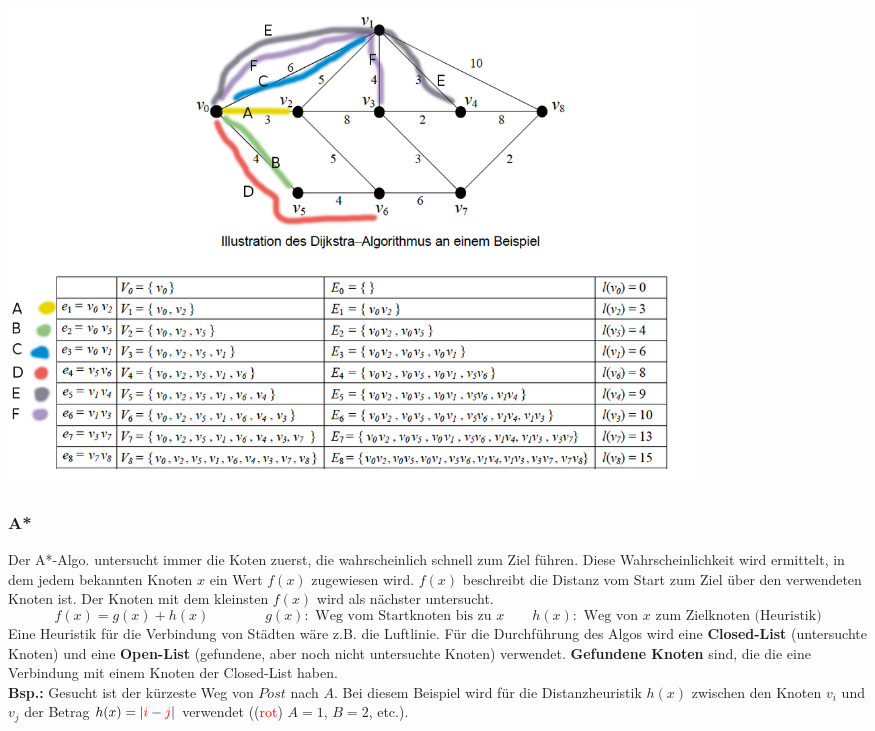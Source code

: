 \begin{center}
	\includegraphics[width=0.8\textwidth]{Content/Graphen/Dijkstra.png}
\end{center}


\subsubsection{A*}
Der A*-Algo. untersucht immer die Koten zuerst, die wahrscheinlich schnell zum Ziel führen. Diese Wahrscheinlichkeit wird ermittelt, in dem jedem bekannten Knoten $x$ ein Wert $f(x)$ zugewiesen wird. $f(x)$ beschreibt die Distanz vom Start zum Ziel über den verwendeten Knoten ist. Der Knoten mit dem kleinsten $f(x)$ wird als nächster untersucht.
\[ f(x) = g(x) + h(x) \qquad \qquad g(x): \text{ Weg vom Startknoten bis zu }x  \qquad h(x): \text{ Weg von $x$ zum Zielknoten (Heuristik)}\]
Eine Heuristik für die Verbindung von Städten wäre z.B. die Luftlinie. Für die Durchführung des Algos wird eine \textbf{Closed-List} (untersuchte Knoten) und eine \textbf{Open-List} (gefundene, aber noch nicht untersuchte Knoten) verwendet. \textbf{Gefundene Knoten} sind, die die eine Verbindung mit einem Knoten der Closed-List haben.\\

\textbf{Bsp.:} Gesucht ist der kürzeste Weg von $Post$ nach $A$.
Bei diesem Beispiel wird für die Distanzheuristik $h(x)$ zwischen den Knoten $v_i$ und $v_j$ der Betrag $h(x)=|\textcolor{red}{i}-\textcolor{red}{j}|$ verwendet ((\textcolor{red}{rot}) $A=1$, $B=2$, etc.).

